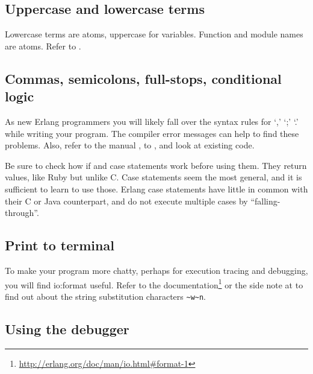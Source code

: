 \documentclass[a4paper]{article}
\begin{document}
\subsection{Uppercase and lowercase terms} %
\label{sub:uppercase_and_lowercase_terms}

Lowercase terms are atoms, uppercase for variables. Function and module names
are atoms. Refer to \cite{manual_expressions}.


\subsection{Commas, semicolons, full-stops, conditional logic} %
\label{sub:commas_semicolons_full_stops}

As new Erlang programmers you will likely fall over the syntax rules for `,'
`;' `.' while writing your program. The compiler error messages can help to
find these problems. Also, refer to the manual \cite{manual_functions}, to
\cite{lyse_function_syntax}, and look at existing code.

Be sure to check how if and case statements work before using them. They
return values, like Ruby but unlike C. Case statements seem the most general,
and it is sufficient to learn to use those. Erlang case statements have little
in common with their C or Java counterpart, and do not execute multiple
cases by ``falling-through''.


\subsection{Print to terminal} %
\label{sub:debug_printing}

To make your program more chatty, perhaps for execution tracing and debugging,
you will find io:format useful. Refer to
the documentation\footnote{\url{http://erlang.org/doc/man/io.html\#format-1}}
or the side note at \cite{lyse_function_syntax} to
find out about the string substitution characters \verb!~w~n!.


\subsection{Using the debugger} %
\label{sub:using_the_debugger}
\end{document}
